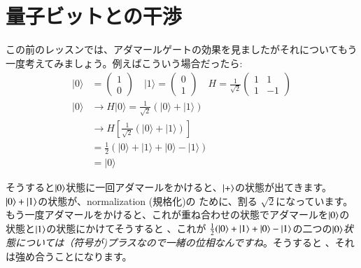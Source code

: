 \section{量子ビットとの干渉}
この前のレッスンでは、アダマールゲートの効果を見ましたがそれについてもう一度考えてみましょう。例えばこういう場合だったら:
\begin{equation}
\begin{aligned}
|0\rangle &=\left(\begin{array}{l}
1 \\
0
\end{array}\right) \quad|1\rangle=\left(\begin{array}{l}
0 \\
1
\end{array}\right) \quad H=\frac{1}{\sqrt{2}}\left(\begin{array}{cc}
1 & 1 \\
1 & -1
\end{array}\right) \\
|0\rangle & \longrightarrow H|0\rangle=\frac{1}{\sqrt{2}}(|0\rangle+|1\rangle) \\
& \longrightarrow H\left[\frac{1}{\sqrt{2}}(|0\rangle+|1\rangle)\right] \\
&=\frac{1}{2}(|0\rangle+|1\rangle+|0\rangle-|1\rangle) \\
&=|0\rangle
\end{aligned}
\end{equation}

そうすると$\ket{0}$状態に一回アダマールをかけると、$\ket{+}$の状態が出てきます。$\ket{0} + \ket{1}$の状態が、normalization (規格化)の ために、割る $\sqrt{2}$になっています。もう一度アダマールをかけると、これが重ね合わせの状態でアダマールを$\ket{0}$の状態と$\ket{1}$の状態にかけてそうすると 、これが
$\frac{1}{2}(\ket{0}+\ket{1}+\ket{0}-\ket{1}$の二つの$\ket{0}$\textit{状態については（符号が)プラスなので一緒の位相なんですね}。そうすると 、それは強め合うことになります。

